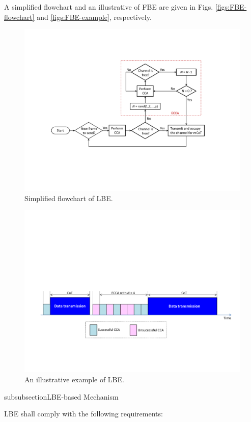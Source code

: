 A simplified flowchart and an illustrative of FBE are given in Figs. \ref{figs:FBE-flowchart} and \ref{figs:FBE-example}, respectively.


\begin{figure}[!t]
	\centering
	\includegraphics[width=0.9\columnwidth]{figures2/LBE-flowchart}
	\caption{Simplified flowchart of LBE.}
	\label{figs:LBE-flowchart}
\end{figure}

\begin{figure}[!t]
	\centering
	\includegraphics[width=0.9\columnwidth]{figures2/LBE-example}
	\caption{An illustrative example of LBE.}
	\label{figs:LBE-example}
\end{figure}


subsubsection{LBE-based Mechanism}
\label{etsi-lbt:lbe}

LBE shall comply with the following requirements:

